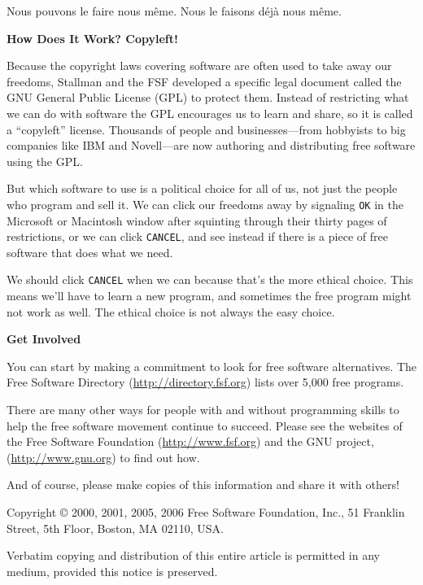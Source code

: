 \documentclass[twoside,12pt]{article}
\begin{document}
Nous pouvons le faire nous même. Nous le faisons déjà nous même.

\begin{center}
{\Large\bf How Does It Work? Copyleft!}
\end{center}

Because the copyright laws covering software are often used to take away our
freedoms, Stallman and the FSF developed a specific legal document called the
GNU General Public License (GPL) to protect them. Instead of restricting what
we can do with software the GPL encourages us to learn and share, so it is
called a ``copyleft'' license. Thousands of people and businesses---from
hobbyists to big companies like IBM and Novell---are now authoring and
distributing free software using the GPL.

But which software to use is a political choice for all of us, not just the
people who program and sell it. We can click our freedoms away by signaling
{\tt OK} in the Microsoft or Macintosh window after squinting through their
thirty pages of restrictions, or we can click {\tt CANCEL}, and see instead if
there is a piece of free software that does what we need.

We should click {\tt CANCEL} when we can because that's the more ethical choice.
This means we'll have to learn a new program, and sometimes the free program
might not work as well. The ethical choice is not always the easy choice.

\begin{center}
{\Large\bf Get Involved}
\end{center}

You can start by making a commitment to look for free software alternatives.
The Free Software Directory (\url{http://directory.fsf.org}) lists over 5,000 free
programs.

There are many other ways for people with and without programming skills to
help the free software movement continue to succeed. Please see the websites of
the Free Software Foundation (\url{http://www.fsf.org}) and the GNU project,
(\url{http://www.gnu.org}) to find out how.

And of course, please make copies of this information and share it with
others!

\vspace{0.3in}

{\small

\noindent Copyright \copyright\/ 2000, 2001, 2005, 2006 Free Software Foundation, Inc., 51
Franklin Street, 5th Floor, Boston, MA 02110, USA.

Verbatim copying and distribution of this entire article is permitted
in any medium, provided this notice is preserved.
}
\end{document}
